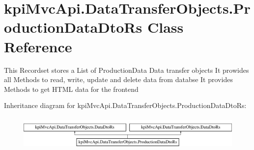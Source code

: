 \hypertarget{classkpi_mvc_api_1_1_data_transfer_objects_1_1_production_data_dto_rs}{}\section{kpi\+Mvc\+Api.\+Data\+Transfer\+Objects.\+Production\+Data\+Dto\+Rs Class Reference}
\label{classkpi_mvc_api_1_1_data_transfer_objects_1_1_production_data_dto_rs}


This Recordset stores a List of Production\+Data Data transfer objects It prowides all Methods to read, write, update and delete data from databse It provides Methods to get H\+T\+ML data for the frontend  


Inheritance diagram for kpi\+Mvc\+Api.\+Data\+Transfer\+Objects.\+Production\+Data\+Dto\+Rs\+:\begin{figure}[H]
\begin{center}
\leavevmode
\includegraphics[height=1.723077cm]{classkpi_mvc_api_1_1_data_transfer_objects_1_1_production_data_dto_rs}
\end{center}
\end{figure}
